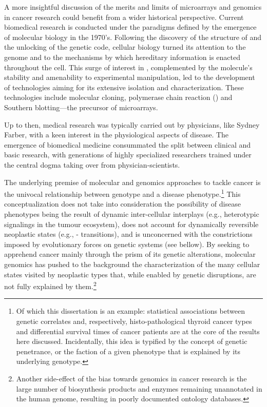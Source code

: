 \medskip{}

A more insightful discussion of the merits and limits of microarrays and
genomics in cancer research could benefit from a wider historical perspective.
Current biomedical research is conducted under the paradigms defined by the
emergence of molecular biology in the 1970's.  Following the discovery of the
structure of  and the unlocking of the genetic code, cellular
biology turned its attention to the genome and to the mechanisms by which
hereditary information is enacted throughout the cell.  This surge of interest
in , complemented by the molecule's stability and amenability to
experimental manipulation, led to the development of technologies aiming for its
extensive isolation and characterization.  These technologies include molecular
cloning, polymerase chain reaction () and Southern blotting---the
precursor of microarrays.

Up to then, medical research was typically carried out by physicians, like
Sydney Farber, with a keen interest in the physiological aspects of disease.
The emergence of biomedical medicine consummated the split between clinical and
basic research, with generations of highly specialized researchers trained under
the central dogma taking over from physician-scientists.

The underlying premise of molecular and genomics approaches to tackle cancer is
the univocal relationship between genotype and a disease phenotype.\footnote{Of
  which this dissertation is an example: statistical associations between
  genetic correlates and, respectively, histo-pathological thyroid cancer types
  and differential survival times of cancer patients are at the core of the
  results here discussed.  Incidentally, this idea is typified by the concept of
  genetic penetrance, or the faction of a given phenotype that is explained by
  its underlying genotype.} This conceptualization does not take into
consideration the possibility of disease phenotypes being the result of dynamic
inter-cellular interplays (e.g., heterotypic signalings in the tumour
ecosystem), does not account for dynamically reversible neoplastic states (e.g.,
- transitions), and is unconcerned with the
constrictions imposed by evolutionary forces on genetic systems (see bellow).
By seeking to apprehend cancer mainly through the prism of its genetic
alterations, molecular genomics has pushed to the background the
characterization of the many cellular states visited by neoplastic types that,
while enabled by genetic disruptions, are not fully explained by
them.\footnote{Another side-effect of the bias towards genomics in cancer
  research is the large number of biosynthesis products and enzymes remaining
  unannotated in the human genome, resulting in poorly documented ontology
  databases.}

